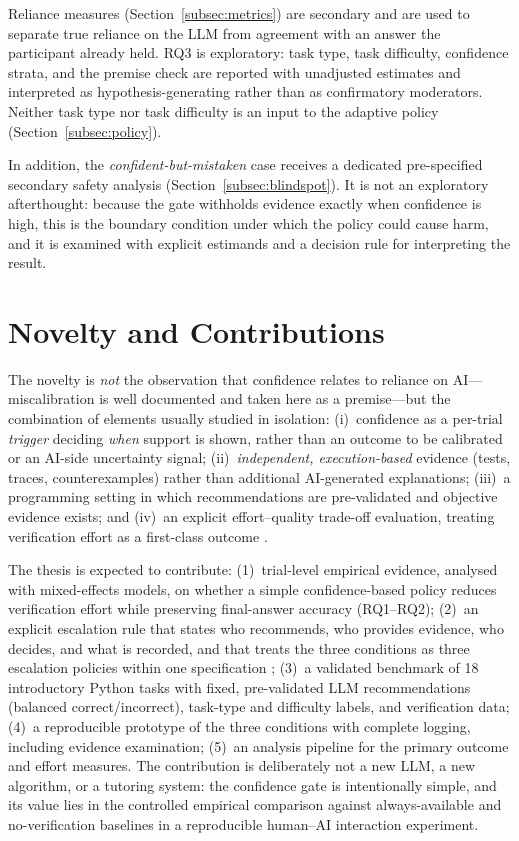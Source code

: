 \documentclass[oneside,final,14pt,a4paper]{extreport}
\begin{document}
Reliance measures (Section~\ref{subsec:metrics}) are secondary and are used to
separate true reliance on the LLM from agreement with an answer the participant
already held. RQ3 is exploratory: task type, task difficulty, confidence
strata, and the premise check are reported with unadjusted estimates and
interpreted as hypothesis-generating rather than as confirmatory moderators.
Neither task type nor task difficulty is an input to the adaptive policy
(Section~\ref{subsec:policy}).

In addition, the \emph{confident-but-mistaken} case receives a dedicated
pre-specified secondary safety analysis (Section~\ref{subsec:blindspot}). It is
not an exploratory afterthought: because the gate withholds evidence exactly
when confidence is high, this is the boundary condition under which the policy
could cause harm, and it is examined with explicit estimands and a decision
rule for interpreting the result.


\section{Novelty and Contributions}


The novelty is \emph{not} the observation that confidence relates to reliance
on AI---miscalibration is well documented \cite{KrugerDunning1999,Bo2025} and
taken here as a premise---but the combination of elements usually studied in
isolation: (i)~confidence as a per-trial \emph{trigger} deciding \emph{when}
support is shown, rather than an outcome to be calibrated or an AI-side
uncertainty signal; (ii)~\emph{independent, execution-based} evidence (tests,
traces, counterexamples) rather than additional AI-generated explanations;
(iii)~a programming setting in which recommendations are pre-validated and
objective evidence exists; and (iv)~an explicit effort--quality trade-off
evaluation, treating verification effort as a first-class outcome
\cite{CascadedLM2025,Zhang2024Verify}.


The thesis is expected to contribute: (1)~trial-level empirical evidence,
analysed with mixed-effects models, on whether a simple confidence-based
policy reduces verification effort while preserving final-answer accuracy
(RQ1--RQ2); (2)~an explicit escalation rule that states who recommends, who
provides evidence, who decides, and what is recorded, and that treats the three
conditions as three escalation policies within one specification
\cite{Ciancarini2027}; (3)~a validated benchmark of 18 introductory Python
tasks with fixed, pre-validated LLM recommendations (balanced
correct/incorrect), task-type and difficulty labels, and verification data;
(4)~a reproducible prototype of the three conditions with complete logging,
including evidence examination; (5)~an analysis pipeline for the primary
outcome and effort measures.
The contribution is deliberately not a new LLM, a new algorithm, or a
tutoring system: the confidence gate is intentionally simple, and its value
lies in the controlled empirical comparison against always-available and
no-verification baselines in a reproducible human--AI interaction experiment.
\end{document}
